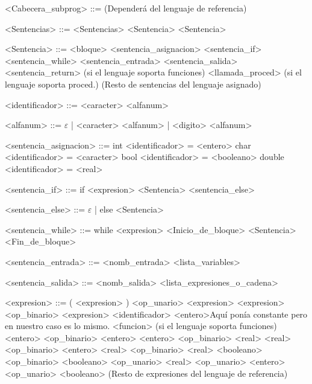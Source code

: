 \documentclass{scrartcl}
\begin{document}
\begin{grammar}
<Cabecera_subprog> ::= (Dependerá del lenguaje de referencia)

<Sentencias> ::= <Sentencias> <Sentencia>
\alt <Sentencia>

<Sentencia> ::= <bloque>
\alt <sentencia_asignacion>
\alt <sentencia_if>
\alt <sentencia_while>
\alt <sentencia_entrada>
\alt <sentencia_salida>
\alt <sentencia_return> (si el lenguaje soporta funciones)
\alt <llamada_proced> (si el lenguaje soporta proced.)
\alt (Resto de sentencias del lenguaje asignado)

<identificador> ::= <caracter> <alfanum>

<alfanum> ::= $\varepsilon$ | <caracter> <alfanum> | <digito> <alfanum>

<sentencia_asignacion> ::=  int <identificador> = <entero>
\alt char <identificador> = <caracter>
\alt bool <identificador> = <booleano>
\alt double <identificador> = <real>

<sentencia_if> ::= if <expresion>
 <Sentencia> <sentencia_else>
 
 <sentencia_else> ::= $\varepsilon$ | else <Sentencia>

<sentencia_while> ::= while <expresion> <Inicio_de_bloque>
<Sentencia>
<Fin_de_bloque>

<sentencia_entrada> ::= <nomb_entrada> <lista_variables>

<sentencia_salida> ::= <nomb_salida> <lista_expresiones_o_cadena>

<expresion> ::= ( <expresion> )
\alt <op_unario> <expresion>
\alt <expresion> <op_binario> <expresion>
\alt <identificador>
\alt <entero>Aquí ponía constante pero en nuestro caso es lo mismo.
\alt <funcion> (si el lenguaje soporta funciones)
\alt <entero> <op_binario> <entero>
\alt <entero> <op_binario> <real>
\alt <real> <op_binario> <entero>
\alt <real> <op_binario> <real>
\alt <booleano> <op_binario> <booleano>
\alt <op_unario> <real>
\alt <op_unario> <entero>
\alt <op_unario> <booleano>
\alt (Resto de expresiones del lenguaje de referencia)


\end{grammar}
\end{document}

